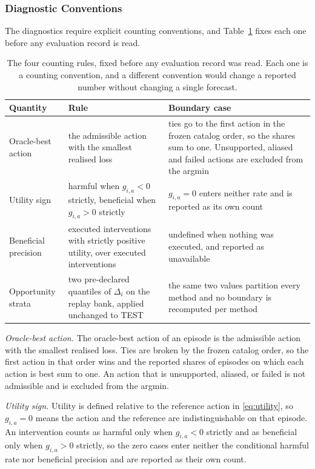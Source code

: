 \documentclass{article}
\begin{document}
\subsubsection{Diagnostic Conventions}
\label{app:diagnostic-conventions}
The diagnostics require explicit counting conventions, and
Table~\ref{tab:app-counting} fixes each one before any evaluation record is read.

\begin{table}[htbp]
  \caption{The four counting rules, fixed before any evaluation record was read. Each one is a
  counting convention, and a different convention would change a reported number
  without changing a single forecast.}
  \label{tab:app-counting}
  \centering
  \small
  \setlength{\tabcolsep}{4pt}
\begin{tabular}{@{}p{} p{} p{}@{}}
    \toprule
    Quantity & Rule & Boundary case \\
    \midrule
    Oracle-best action & the admissible action with the smallest realised loss & ties go to the first action in the frozen catalog order, so the shares sum to one. Unsupported, aliased and failed actions are excluded from the argmin \\
    Utility sign & harmful when $g_{i,a} < 0$ strictly, beneficial when $g_{i,a} > 0$ strictly & $g_{i,a} = 0$ enters neither rate and is reported as its own count \\
    Beneficial precision & executed interventions with strictly positive utility, over executed interventions & undefined when nothing was executed, and reported as unavailable \\
    Opportunity strata & two pre-declared quantiles of $\Delta_i$ on the replay bank, applied unchanged to TEST & the same two values partition every method and no boundary is recomputed per method \\
    \bottomrule
  \end{tabular}
\end{table}

\emph{Oracle-best action.} The oracle-best action of an episode is the admissible action with
the smallest realised loss. Ties are broken by the frozen catalog order, so the first action in
that order wins and the reported shares of episodes on which each action is best sum to one. An
action that is unsupported, aliased, or failed is not admissible and is excluded from the
argmin.

\emph{Utility sign.} Utility is defined relative to the reference action in
\eqref{eq:utility}, so $g_{i,a} = 0$ means the action and the reference are indistinguishable on
that episode. An intervention counts as harmful only when $g_{i,a} < 0$ strictly and as
beneficial only when $g_{i,a} > 0$ strictly, so the zero cases enter neither the conditional
harmful rate nor beneficial precision and are reported as their own count.
\end{document}
